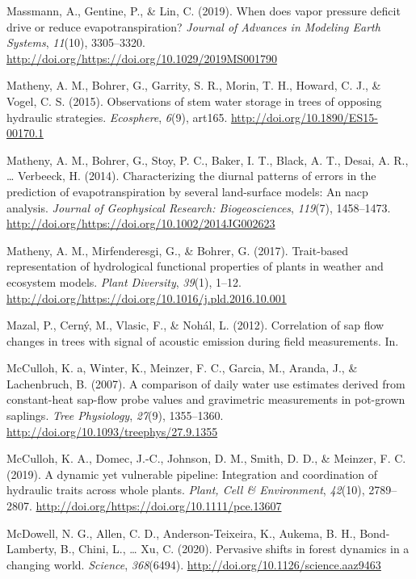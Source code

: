 \documentclass[11pt,twoside]{reedthesis}
\begin{document}
\hypertarget{ref-Massmann2019}{}
Massmann, A., Gentine, P., \& Lin, C. (2019). When does vapor pressure
deficit drive or reduce evapotranspiration? \emph{Journal of Advances in
Modeling Earth Systems}, \emph{11}(10), 3305--3320.
\url{http://doi.org/https://doi.org/10.1029/2019MS001790}

\hypertarget{ref-matheny_observations_2015}{}
Matheny, A. M., Bohrer, G., Garrity, S. R., Morin, T. H., Howard, C. J.,
\& Vogel, C. S. (2015). Observations of stem water storage in trees of
opposing hydraulic strategies. \emph{Ecosphere}, \emph{6}(9), art165.
\url{http://doi.org/10.1890/ES15-00170.1}

\hypertarget{ref-Matheny2014}{}
Matheny, A. M., Bohrer, G., Stoy, P. C., Baker, I. T., Black, A. T.,
Desai, A. R., \ldots{} Verbeeck, H. (2014). Characterizing the diurnal
patterns of errors in the prediction of evapotranspiration by several
land-surface models: An nacp analysis. \emph{Journal of Geophysical
Research: Biogeosciences}, \emph{119}(7), 1458--1473.
\url{http://doi.org/https://doi.org/10.1002/2014JG002623}

\hypertarget{ref-Matheny2017}{}
Matheny, A. M., Mirfenderesgi, G., \& Bohrer, G. (2017). Trait-based
representation of hydrological functional properties of plants in
weather and ecosystem models. \emph{Plant Diversity}, \emph{39}(1),
1--12. \url{http://doi.org/https://doi.org/10.1016/j.pld.2016.10.001}

\hypertarget{ref-Mazal2012}{}
Mazal, P., Cerný, M., Vlasic, F., \& Nohál, L. (2012). Correlation of
sap flow changes in trees with signal of acoustic emission during field
measurements. In.

\hypertarget{ref-McCulloh2007}{}
McCulloh, K. a, Winter, K., Meinzer, F. C., Garcia, M., Aranda, J., \&
Lachenbruch, B. (2007). A comparison of daily water use estimates
derived from constant-heat sap-flow probe values and gravimetric
measurements in pot-grown saplings. \emph{Tree Physiology},
\emph{27}(9), 1355--1360.
\url{http://doi.org/10.1093/treephys/27.9.1355}

\hypertarget{ref-McCulloh2019}{}
McCulloh, K. A., Domec, J.-C., Johnson, D. M., Smith, D. D., \& Meinzer,
F. C. (2019). A dynamic yet vulnerable pipeline: Integration and
coordination of hydraulic traits across whole plants. \emph{Plant, Cell
\& Environment}, \emph{42}(10), 2789--2807.
\url{http://doi.org/https://doi.org/10.1111/pce.13607}

\hypertarget{ref-McDowell2020}{}
McDowell, N. G., Allen, C. D., Anderson-Teixeira, K., Aukema, B. H.,
Bond-Lamberty, B., Chini, L., \ldots{} Xu, C. (2020). Pervasive shifts
in forest dynamics in a changing world. \emph{Science},
\emph{368}(6494). \url{http://doi.org/10.1126/science.aaz9463}
\end{document}
